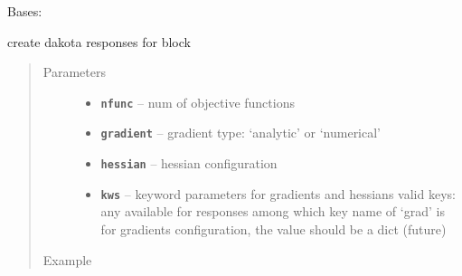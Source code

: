 \documentclass[letterpaper,10pt,english]{sphinxmanual}
\begin{document}

\begin{fulllineitems}
\label{src/apidocs/dakutils:genopt.dakutils.DakotaResponses}
Bases: \href{https://docs.python.org/2/library/functions.html\#object}{}

create dakota responses for  block
\begin{quote}\begin{description}
\item[{Parameters}] \leavevmode\begin{itemize}
\item {} 
\textbf{\texttt{nfunc}} -- num of objective functions

\item {} 
\textbf{\texttt{gradient}} -- gradient type: `analytic' or `numerical'

\item {} 
\textbf{\texttt{hessian}} -- hessian configuration

\item {} 
\textbf{\texttt{kws}} -- keyword parameters for gradients and hessians
valid keys: any available for responses
among which key name of `grad' is for gradients configuration, 
the value should be a dict (future)

\end{itemize}

\item[{Example}] \leavevmode
\end{description}\end{quote}


\end{fulllineitems}
\end{document}
